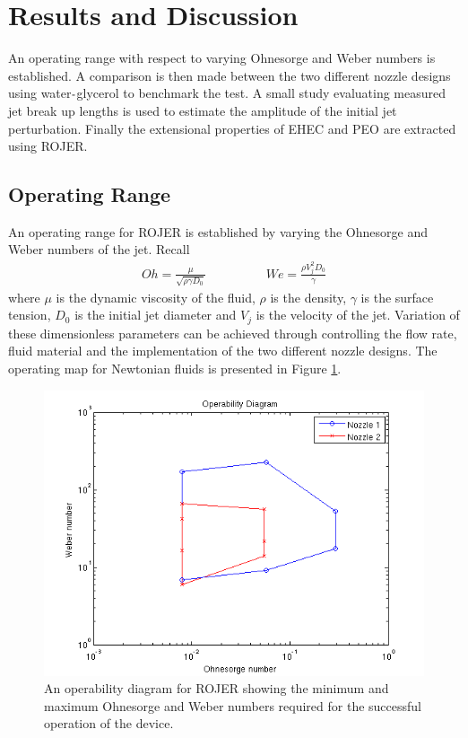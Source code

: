 \documentclass[11pt]{article}
\begin{document}
\newpage

\section{Results and Discussion}
An operating range with respect to varying Ohnesorge and Weber numbers is 
established. A comparison is then made between the two different nozzle designs 
using water${\text -}$glycerol to benchmark the test. A small study evaluating 
measured jet break up lengths is used to estimate the amplitude of the initial 
jet perturbation. Finally the extensional properties of EHEC and PEO are 
extracted using ROJER.

\subsection{Operating Range} \label{sec:operating}
An operating range for ROJER is established by varying the Ohnesorge and Weber 
numbers of the jet. Recall
\begin{align}
Oh = \frac{\mu}{\sqrt{\rho \gamma D_0}} \hspace{2cm} We = \frac{\rho V_j^2 
D_0}{\gamma}
\end{align}
where $\mu$ is the dynamic viscosity of the fluid, $\rho$ is the density, 
$\gamma$ is the surface tension, $D_0$ is the initial jet diameter and $V_j$ is 
the velocity of the jet. Variation of these dimensionless parameters can be 
achieved through controlling the flow rate, fluid material and the 
implementation of the two different nozzle designs. The operating map for 
Newtonian fluids is presented in Figure \ref{fig:operability}.
\begin{figure}[h]
	\begin{center}
		\includegraphics[scale=0.5]{img/operability.png}
		\caption{An operability diagram for ROJER showing the minimum and 
maximum Ohnesorge and Weber numbers required for the successful operation of 
the device.}
		\label{fig:operability}
	\end{center}
\end{figure}
\end{document}
